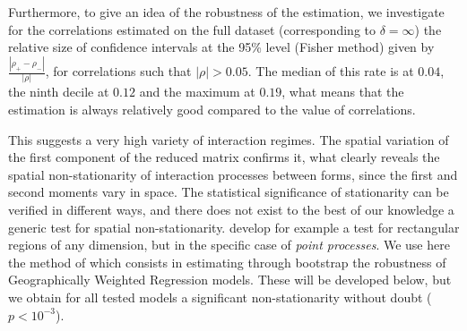 Furthermore, to give an idea of the robustness of the estimation, we investigate for the correlations estimated on the full dataset (corresponding to $\delta = \infty$) the relative size of confidence intervals at the 95\% level (Fisher method) given by $\frac{\left|\rho_+ - \rho_-\right|}{\left|\rho\right|}$, for correlations such that $\left|\rho\right|>0.05$. The median of this rate is at $0.04$, the ninth decile at $0.12$ and the maximum at $0.19$, what means that the estimation is always relatively good compared to the value of correlations.



This suggests a very high variety of interaction regimes. The spatial variation of the first component of the reduced matrix confirms it, what clearly reveals the spatial non-stationarity of interaction processes between forms, since the first and second moments vary in space. The statistical significance of stationarity can be verified in different ways, and there does not exist to the best of our knowledge a generic test for spatial non-stationarity. \cite{zhang2014test} develop for example a test for rectangular regions of any dimension, but in the specific case of \emph{point processes}. We use here the method of \cite{leung2000statistical} which consists in estimating through bootstrap the robustness of Geographically Weighted Regression models. These will be developed below, but we obtain for all tested models a significant non-stationarity without doubt ($p<10^{-3}$).








